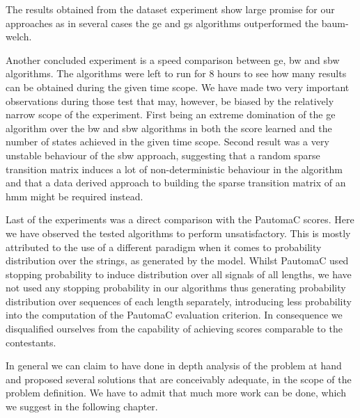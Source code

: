 The results obtained from the dataset experiment show large promise for our approaches as in several cases the \gls{ge} and \gls{gs} algorithms outperformed the \gls{baum-welch}.

Another concluded experiment is a speed comparison between \acrlong{ge}, \acrlong{bw} and \acrlong{sbw} algorithms. The algorithms were left to run for 8 hours to see how many results can be obtained during the given time scope. We have made two very important observations during those test that may, however, be biased by the relatively narrow scope of the experiment. First being an extreme domination of the \gls{ge} algorithm over the \gls{bw} and \gls{sbw} algorithms in both the score learned and the number of states achieved in the given time scope. Second result was a very unstable behaviour of the \gls{sbw} approach, suggesting that a random sparse transition matrix induces a lot of non-deterministic behaviour in the algorithm and that a data derived approach to building the sparse transition matrix of an \gls{hmm} might be required instead.

Last of the experiments was a direct comparison with the PautomaC scores. Here we have observed the tested algorithms to perform unsatisfactory. This is mostly attributed to the use of a different paradigm when it comes to probability distribution over the strings, as generated by the model. Whilst PautomaC used stopping probability to induce distribution over all signals of all lengths, we have not used any stopping probability in our algorithms thus generating probability distribution over sequences of each length separately, introducing less probability into the computation of the PautomaC evaluation criterion. In consequence we disqualified ourselves from the capability of achieving scores comparable to the contestants.

In general we can claim to have done in depth analysis of the problem at hand and proposed several solutions that are conceivably adequate, in the scope of the problem definition. We have to admit that much more work can be done, which we suggest in the following chapter.